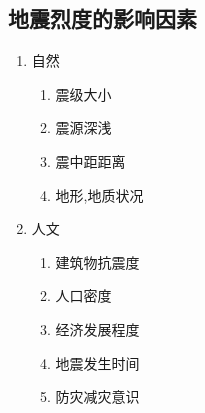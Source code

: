\documentclass[a4paper]{article}
\begin{document}
    \subsection{地震烈度的影响因素}
    \begin{enumerate}
        \item 自然
        \begin{enumerate}
            \item 震级大小
            \item 震源深浅
            \item 震中距距离
            \item 地形,地质状况
        \end{enumerate}
        \item 人文
        \begin{enumerate}
            \item 建筑物抗震度
            \item 人口密度
            \item 经济发展程度
            \item 地震发生时间
            \item 防灾减灾意识
        \end{enumerate}
    \end{enumerate}
\end{document}
